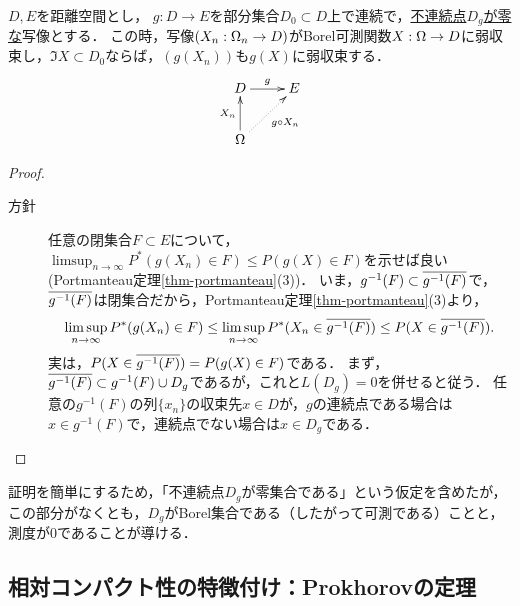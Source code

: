 \documentclass[uplatex,dvipdfmx]{jsreport}
\begin{document}
\begin{theorem}\label{thm-continuous-map-theorem}
    $D,E$を距離空間とし，
    $g:D\to E$を部分集合$D_0\subset D$上で連続で，\underline{不連続点$D_g$が零な}写像とする．
    この時，写像$(X_n:\Omega_n\to D)$がBorel可測関数$X:\Omega\to D$に弱収束し，$\Im X\subset D_0$ならば，$(g(X_n))$も$g(X)$に弱収束する．
    \[\xymatrix{
        D\ar[r]^-g&E\\
        \Om\ar[u]^-{X_n}\ar@{.>}[ur]_-{g\circ X_n}
    }\]
\end{theorem}
\begin{proof}\mbox{}
    \begin{description}
        \item[方針] 任意の閉集合$F\subset E$について，$\limsup_{n\to\infty}P^*(g(X_n)\in F)\le P(g(X)\in F)$を示せば良い(Portmanteau定理\ref{thm-portmanteau}(3))．
        いま，$g^{-1}(F)\subset\overline{g^{-1}(F)}$で，$\overline{g^{-1}(F)}$は閉集合だから，Portmanteau定理\ref{thm-portmanteau}(3)より，
        \[\limsup_{n\to\infty}P^*(g(X_n)\in F)\le\limsup_{n\to\infty}P^*(X_n\in\overline{g^{-1}(F)})\le P(X\in\overline{g^{-1}(F)}).\]
        実は，$P(X\in\overline{g^{-1}(F)})=P(g(X)\in F)$である．
        まず，$\overline{g^{-1}(F)}\subset g^{-1}(F)\cup D_g$であるが，これと$L(D_g)=0$を併せると従う．
        任意の$g^{-1}(F)$の列$\{x_n\}$の収束先$x\in D$が，$g$の連続点である場合は$x\in g^{-1}(F)$で，連続点でない場合は$x\in D_g$である．
    \end{description}
\end{proof}
\begin{remark}
    証明を簡単にするため，「不連続点$D_g$が零集合である」という仮定を含めたが，
    この部分がなくとも，$D_g$がBorel集合である（したがって可測である）ことと，測度が$0$であることが導ける．
\end{remark}

\subsection{相対コンパクト性の特徴付け：Prokhorovの定理}
\end{document}
